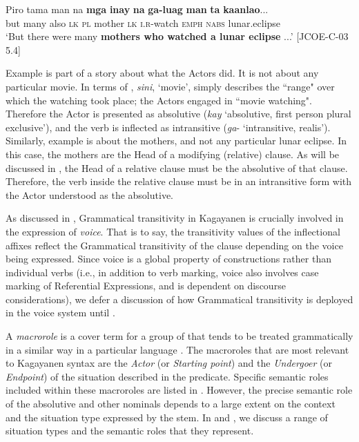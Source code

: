 \gll Piro  tama  man  na  \textbf{mga}  \textbf{inay}  \textbf{na}  \textbf{ga-luag}  \textbf{man}  \textbf{ta} \textbf{kaanlao}... \\
but  many  also  \textsc{lk}  \textsc{pl}  mother  \textsc{lk}  \textsc{i.r}-watch  \textsc{emph}  \textsc{nabs}  lunar.eclipse \\
\glt ‘But there were many \textbf{mothers who watched a lunar eclipse} ...’ [JCOE-C-03 5.4]
\z

Example  is part of a story about what the Actors did. It is not about any particular movie.  In terms of \citealt{halliday2004}, \textit{sini}, `movie', simply describes the ``range" over which the watching took place; the Actors engaged in ``movie watching". Therefore the Actor is presented as absolutive (\textit{kay} `absolutive, first person plural exclusive'), and the verb is inflected as intransitive (\textit{ga}- `intransitive, realis'). Similarly, example  is about the mothers, and not any particular lunar eclipse. In this case, the mothers are the Head of a modifying (relative) clause. As will be discussed in , the Head of a relative clause must be the absolutive of that clause. Therefore, the verb inside the relative clause must be in an intransitive form with the Actor understood as the absolutive.

As discussed in , Grammatical  transitivity in Kagayanen is crucially involved in the expression of \textit{voice}. That is to say, the transitivity values of the inflectional affixes reflect the Grammatical  transitivity of the clause depending on the voice being expressed. Since voice is a global property of constructions rather than individual verbs (i.e., in addition to verb marking, voice also involves case marking of Referential Expressions, and is dependent on discourse considerations), we defer a discussion of how Grammatical  transitivity is deployed in the voice system until .

A \textit{macrorole} is a cover term for a group of  that tends to be treated grammatically in a similar way in a particular language \citep{vanvalin2000}. The macroroles that are most relevant to Kagayanen syntax are the \textit{Actor} (or \textit{Starting point}) and the \textit{Undergoer} (or \textit{Endpoint}) of the situation described in the predicate. Specific semantic roles included within these macroroles are listed in . However, the precise semantic role of the absolutive and other nominals depends to a large extent on the context and the situation type expressed by the stem. In  and , we discuss a range of situation types and the semantic roles that they represent.

